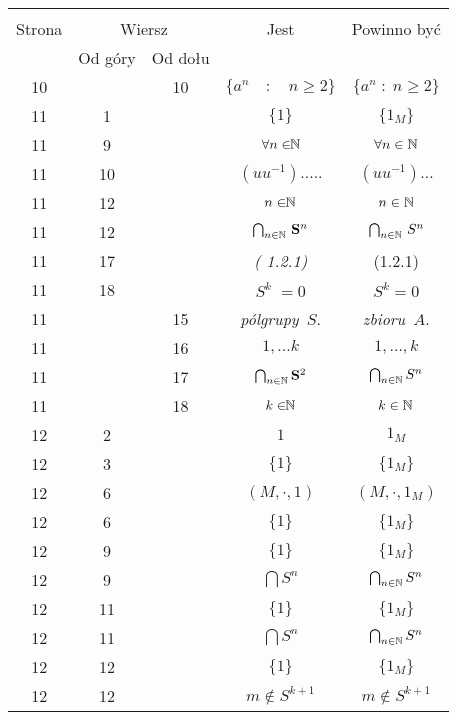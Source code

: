 \documentclass[a4paper,11pt]{article}
\begin{document}
\begin{center}
  \begin{tabular}{|c|c|c|c|c|}
    \hline
    & \multicolumn{2}{c|}{} & & \\
    Strona & \multicolumn{2}{c|}{Wiersz} & Jest
                              & Powinno być \\ \cline{2-3}
    & Od góry & Od dołu & & \\
    \hline
    10 & & 10 & $\{ a^{ n } \quad : \quad n \geq 2 \}$ & $\{ a^{ n } \; : \; n \geq 2 \}$ \\
    11 &  1 & & $\{ 1 \}$ & $\{ 1_{ M } \}$ \\
    11 &  9 & & $\forall n \in \!\! \mathbb{N}$ & $\forall n \in \mathbb{N}$ \\
    11 & 10 & & $( u u^{ -1 } ).....$ & $( u u^{ - 1 } ) \ldots$ \\
    11 & 12 & & $n \in \!\! \mathbb{N}$ & $n \in \mathbb{N}$ \\
    11 & 12 & & $\bigcap_{ n \in \mathbb{N} } \, \mathbf{S}^{ n }$
           & $\bigcap_{ n \in \mathbb{N} } \, S^{ n }$ \\
    11 & 17 & & \textit{( 1.2.1)} & (1.2.1) \\
    11 & 18 & & $S^{ k } \; = 0$ & $S^{ k } = 0$ \\
    11 & & 15 & \textit{pólgrupy}~$S$. & \textit{zbioru}~$A$. \\
    11 & & 16 & $1, ...k$ & $1, \ldots, k$ \\
    11 & & 17 & $\bigcap_{ n \in \mathbb{N} } \mathbf{S}^{ 2 }$
           & $\bigcap_{ n \in \mathbb{N} } S^{ n }$ \\
    11 & & 18 & $k \in \!\! \mathbb{N}$ & $k \in \mathbb{N}$ \\
    12 &  2 & & $1$ & $1_{ M }$ \\
    12 &  3 & & $\{ 1 \}$ & $\{ 1_{ M } \}$ \\
    12 &  6 & & $( M, \cdot, 1 )$ & $( M, \cdot, 1_{ M } )$ \\
    12 &  6 & & $\{ 1 \}$ & $\{ 1_{ M } \}$ \\
    12 &  9 & & $\{ 1 \}$ & $\{ 1_{ M } \}$ \\
    12 &  9 & & $\bigcap S^{ n }$ & $\bigcap_{ n \in \mathbb{N} } S^{ n }$ \\
    12 & 11 & & $\{ 1 \}$ & $\{ 1_{ M } \}$ \\
    12 & 11 & & $\bigcap S^{ n }$ & $\bigcap_{ n \in \mathbb{N} } S^{ n }$ \\
    12 & 12 & & $\{ 1 \}$ & $\{ 1_{ M } \}$ \\
    12 & 12 & & $m \!\! \notin \!\! S^{ k + 1 }$ & $m \notin S^{ k + 1 }$ \\

\end{tabular}
\end{center}
\end{document}
